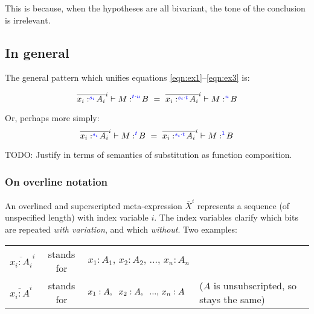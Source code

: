 \documentclass{article}
\newcommand{\todo}[1]{{\color{red}#1}}
\newcommand{\tm}{1}             %
\newcommand{\tc}{\cdot}         %
\newcommand{\h}[3]{#1 :^{#3}\! {#2}}
\begin{document}
This is because, when the hypotheses are all bivariant, the tone of the
conclusion is irrelevant.


\subsection{In general}
The general pattern which unifies equations \ref{eqn:ex1}--\ref{eqn:ex3} is:

\newcommand{\hilited}{\color{blue}}

\begin{equation}
  \overline{\h{x_i}{A_i}{\hilited s_i}}^i \vdash \h{M}{B}{\hilited t \tc u}
  ~=~
  \overline{\h{x_i}{A_i}{\hilited s_i \tc t}}^i
  \vdash \h{M}{B}{\hilited u}
\end{equation}

Or, perhaps more simply:
\begin{equation}
  \overline{\h{x_i}{A_i}{\hilited s_i}}^i \vdash \h{M}{B}{\hilited t}
  ~=~
  \overline{\h{x_i}{A_i}{\hilited s_i \tc t}}^i
  \vdash \h{M}{B}{\hilited\tm}
\end{equation}

\todo{TODO: Justify in terms of semantics of substitution as function
  composition.}

\subsubsection{On overline notation}

An overlined and superscripted meta-expression $\overline{X}^i$ represents a
sequence (of unspecified length) with index variable $i$. The index variables
clarify which bits are repeated \emph{with variation}, and which \emph{without}.
Two examples:

\begin{center}
  \begin{tabular}{lcll}
    $\overline{x_i : A_i}^i$ & stands for
    & $x_1 : A_1,\, x_2 : A_2,\, ...,\, x_n : A_n$
    \\
    $\overline{x_i : A}^i$ & stands for
    & $x_1 : A,\hspace{0.6em} x_2 : A,\hspace{0.6em} ...,\, x_n : A$
    & ($A$ is unsubscripted, so stays the same)
  \end{tabular}
\end{center}
\end{document}
